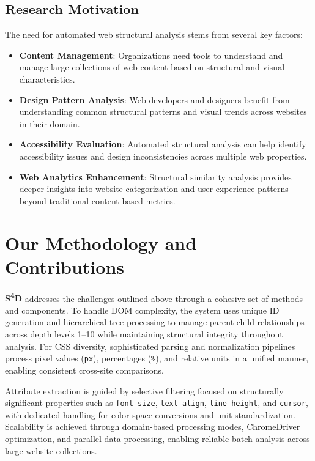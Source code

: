 \subsection{Research Motivation}
\label{subsec:research-motivation}

The need for automated web structural analysis stems from several key factors:

\begin{itemize}
    \item \textbf{Content Management}: Organizations need tools to understand and manage large collections of web content based on structural and visual characteristics.

    \item \textbf{Design Pattern Analysis}: Web developers and designers benefit from understanding common structural patterns and visual trends across websites in their domain.

    \item \textbf{Accessibility Evaluation}: Automated structural analysis can help identify accessibility issues and design inconsistencies across multiple web properties.

    \item \textbf{Web Analytics Enhancement}: Structural similarity analysis provides deeper insights into website categorization and user experience patterns beyond traditional content-based metrics.
\end{itemize}

\section{Our Methodology and Contributions}
\label{sec:methodology-overview}

\textlatin{\textbf{S\textsuperscript{4}D}} addresses the challenges outlined above through a cohesive set of methods and components. To handle DOM complexity, the system uses unique ID generation and hierarchical tree processing to manage parent-child relationships across depth levels 1–10 while maintaining structural integrity throughout analysis. For CSS diversity, sophisticated parsing and normalization pipelines process pixel values (\texttt{px}), percentages (\texttt{\%}), and relative units in a unified manner, enabling consistent cross-site comparisons.

Attribute extraction is guided by selective filtering focused on structurally significant properties such as \texttt{font-size}, \texttt{text-align}, \texttt{line-height}, and \texttt{cursor}, with dedicated handling for color space conversions and unit standardization. Scalability is achieved through domain-based processing modes, ChromeDriver optimization, and parallel data processing, enabling reliable batch analysis across large website collections.

